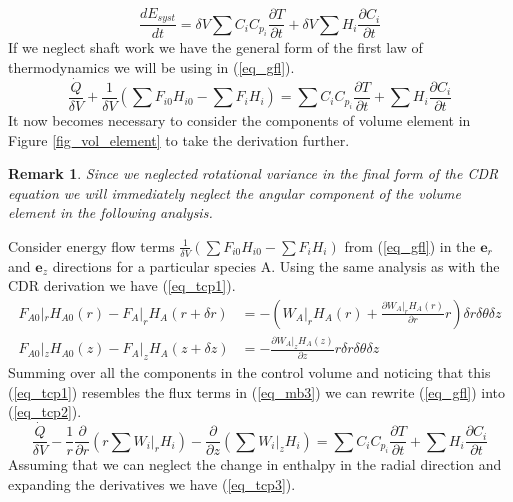 \documentclass[11pt,fleqn]{article}
\theoremstyle{defstyle}
\newtheorem{rmrk}{Remark}[section]
\begin{document}
\begin{equation}
\frac{d E_{syst}}{dt} = \delta V \sum C_i C_{p_i} \frac{\partial T}{\partial t} + \delta V \sum H_i \frac{\partial C_i}{\partial t} 
\label{eq_syse2}
\end{equation}
If we neglect shaft work we have the general form of the first law of thermodynamics we will be using in (\ref{eq_gfl}).  
\begin{equation}
\frac{\dot{Q}}{\delta V} + \frac{1}{\delta V}\left(\sum F_{i0}H_{i0} -\sum F_{i}H_{i}\right) =\sum C_i C_{p_i} \frac{\partial T}{\partial t} + \sum H_i \frac{\partial C_i}{\partial t}
\label{eq_gfl}
\end{equation}
It now becomes necessary to consider the components of volume element  in Figure \ref{fig_vol_element} to take the derivation further.
\begin{rmrk}
Since we neglected rotational variance in the final form of the CDR equation we will immediately neglect the angular component of the volume element in the following analysis.  
\end{rmrk}
Consider energy flow terms $\frac{1}{\delta V}\left(\sum F_{i0}H_{i0} -\sum F_{i}H_{i}\right)$ from (\ref{eq_gfl}) in the $\mathbf{e}_r$ and $\mathbf{e}_z$ directions for a particular species A. Using the same analysis as with the CDR derivation we have (\ref{eq_tcp1}).
\begin{equation}
\begin{aligned}
F_{A0}|_r H_{A0}(r) - F_{A}|_rH_{A}(r+\delta r) &= -\left(W_A|_r H_A(r) + \frac{\partial W_A|_r H_A(r)}{\partial r}r\right)\delta r \delta \theta \delta z \\
F_{A0}|_z H_{A0}(z) - F_{A}|_z H_{A}(z+\delta z) &= -\frac{\partial W_A|_z H_A(z)}{\partial z}r \delta r \delta \theta \delta z   
\end{aligned}
\label{eq_tcp1}
\end{equation}
Summing over all the components in the control volume and noticing that this (\ref{eq_tcp1}) resembles the flux terms in (\ref{eq_mb3}) we can rewrite (\ref{eq_gfl}) into (\ref{eq_tcp2}).
\begin{equation}
\frac{\dot{Q}}{\delta V} - \frac{1}{r}\frac{\partial}{\partial r}\left(r\sum W_i|_r H_i\right) - \frac{\partial}{\partial z}\left(\sum W_i|_z H_i\right) =\sum C_i C_{p_i} \frac{\partial T}{\partial t} + \sum H_i \frac{\partial C_i}{\partial t}
\label{eq_tcp2}
\end{equation}
Assuming that we can neglect the change in enthalpy in the radial direction and expanding the derivatives we have (\ref{eq_tcp3}).
\end{document}
